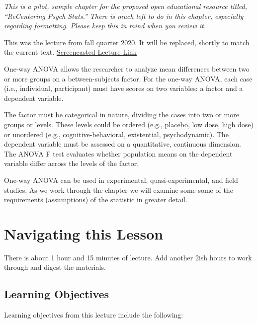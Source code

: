 \documentclass[
  english,
]{book}
\begin{document}
\emph{This is a pilot, sample chapter for the proposed open educational resource titled, ``ReCentering Psych Stats.'' There is much left to do in this chapter, especially regarding formatting. Please keep this in mind when you review it.}

This was the lecture from fall quarter 2020. It will be replaced, shortly to match the current text. \href{https://spu.hosted.panopto.com/Panopto/Pages/Viewer.aspx?pid=9d12a0fb-5046-4c13-8baf-ac4a016ef828}{Screencasted Lecture Link}

One-way ANOVA allows the researcher to analyze mean differences between two or more groups on a between-subjects factor. For the one-way ANOVA, each case (i.e., individual, participant) must have scores on two variables: a factor and a dependent variable.

The factor must be categorical in nature, dividing the cases into two or more groups or levels. These levels could be ordered (e.g., placebo, low dose, high dose) or unordered (e.g., cognitive-behavioral, existential, psychodynamic). The dependent variable must be assessed on a quantitative, continuous dimension. The ANOVA F test evaluates whether population means on the dependent variable differ across the levels of the factor.

One-way ANOVA can be used in experimental, quasi-experimental, and field studies. As we work through the chapter we will examine some some of the requirements (assumptions) of the statistic in greater detail.

\hypertarget{navigating-this-lesson}{%
\section{Navigating this Lesson}\label{navigating-this-lesson}}

There is about 1 hour and 15 minutes of lecture. Add another 2ish hours to work through and digest the materials.

\hypertarget{learning-objectives}{%
\subsection{Learning Objectives}\label{learning-objectives}}

Learning objectives from this lecture include the following:
\end{document}
